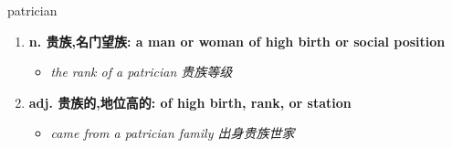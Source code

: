 
\begin{frame}
{\huge patrician}
\begin{center}
\begin{enumerate}\Large
  \item \textbf{n. 贵族,名门望族: a man or woman of high birth or social position}
  \begin{itemize}
    \item \em{\Large{the rank of a patrician 贵族等级}}
  \end{itemize}
  \item \textbf{adj. 贵族的,地位高的: of high birth, rank, or station}
  \begin{itemize}
    \item \em{\Large{came from a patrician family 出身贵族世家}}
  \end{itemize}
\end{enumerate}
\end{center}
\end{frame}
